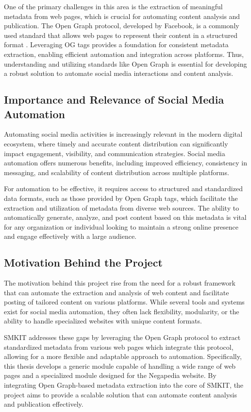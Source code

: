 One of the primary challenges in this area is the extraction of meaningful metadata from web pages, which is crucial for automating content analysis and publication. The Open Graph protocol, developed by Facebook, is a commonly used standard that allows web pages to represent their content in a structured format \cite{ogp_protocol}. Leveraging OG tags provides a foundation for consistent metadata extraction, enabling efficient automation and integration across platforms. Thus, understanding and utilizing standards like Open Graph is essential for developing a robust solution to automate social media interactions and content analysis.

\subsection{Importance and Relevance of Social Media Automation}
\label{subsec:importance_and_relevance_of_social_media_automation}
Automating social media activities is increasingly relevant in the modern digital ecosystem, where timely and accurate content distribution can significantly impact engagement, visibility, and communication strategies. Social media automation offers numerous benefits, including improved efficiency, consistency in messaging, and scalability of content distribution across multiple platforms.

For automation to be effective, it requires access to structured and standardized data formats, such as those provided by Open Graph tags, which facilitate the extraction and utilization of metadata from diverse web sources. The ability to automatically generate, analyze, and post content based on this metadata is vital for any organization or individual looking to maintain a strong online presence and engage effectively with a large audience.

\subsection{Motivation Behind the Project}
\label{subsec:motivation_behind_the_project}
The motivation behind this project rise from the need for a robust framework that can automate the extraction and analysis of web content and facilitate posting of tailored content on various platforms. While several tools and systems exist for social media automation, they often lack flexibility, modularity, or the ability to handle specialized websites with unique content formats.

SMKIT addresses these gaps by leveraging the Open Graph protocol to extract standardized metadata from various web pages which integrate this protocol, allowing for a more flexible and adaptable approach to automation. Specifically, this thesis develops a generic module capable of handling a wide range of web pages and a specialized module designed for the Negapedia website. By integrating Open Graph-based metadata extraction into the core of SMKIT, the project aims to provide a scalable solution that can automate content analysis and publication effectively.



